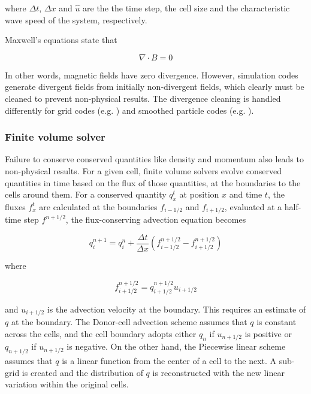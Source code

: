 \documentclass[11pt]{article}
\begin{document}
 where $\Delta t$, $\Delta x$ and $\hat{u}$ are the  the time step, the cell size and the characteristic wave speed of the system, respectively.
 
Maxwell's equations state that 
 
 \begin{equation}
\nabla \cdot B = 0\label{eq:divb}
\end{equation}

In other words, magnetic fields have zero divergence. However, simulation codes generate divergent fields from initially non-divergent fields, which clearly must be cleaned to prevent non-physical results. The divergence cleaning is handled differently for grid codes (e.g. \citealt{Jiang2012}) and smoothed particle codes (e.g. \citealt{Ziegler2006}).

\subsubsection{Finite volume solver}
\label{sub:finite}
Failure to conserve conserved quantities like density and momentum also leads to non-physical results. For a given cell, finite volume solvers evolve conserved quantities in time based on the flux of those quantities, at the boundaries to the cells around them. For a conserved quantity $q_{x}^{t}$ at position $x$ and time $t$, the fluxes $f_{x}^{t}$ are calculated at the boundaries $f_{i-1/2}$ and $f_{i+1/2}$, evaluated at a half-time step $f^{n+1/2}$, the flux-conserving advection equation becomes 

 \begin{equation}
q_{i}^{n+1}=q_{i}^{n} + \frac{\Delta t}{\Delta{x}}(f_{i-1/2}^{n+1/2}-f_{i+1/2}^{n+1/2}) \label{eq:advect}
\end{equation}

where 

\begin{equation}
 f_{i+1/2}^{n+1/2}= q_{i+1/2}^{n+1/2}u_{i+1/2}\label{eq:advect2}
\end{equation}

and $u_{i+1/2}$ is the advection velocity at the boundary. This requires an estimate of $q$ at the boundary. The Donor-cell advection scheme assumes that $q$ is constant across the cells, and the cell boundary adopts either $q_{n}$ if $u_{n+1/2}$ is positive or $q_{n+1/2}$ if $u_{n+1/2}$ is negative. On the other hand, the Piecewise linear scheme assumes that $q$ is a linear function from the center of a cell to the next. A sub-grid is created and the distribution of $q$ is reconstructed with the new linear variation within the original cells.
\end{document}
